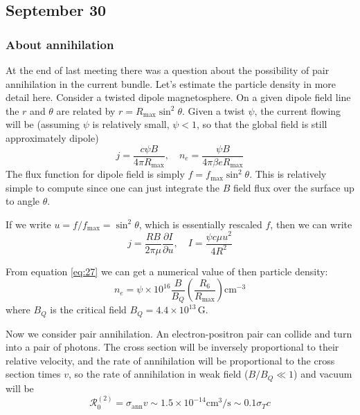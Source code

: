 \documentclass[letterpaper, 11pt]{article}
\numberwithin{equation}{section}
\numberwithin{figure}{section}
\begin{document}
\subsection{September 30}
\label{sec:sept-30}

\subsubsection{About annihilation}
\label{sec:annihilation}

At the end of last meeting there was a question about the possibility of pair annihilation in the current bundle. Let's estimate the particle density in more detail here. Consider a twisted dipole magnetosphere. On a given dipole field line the $r$ and $\theta$ are related by $r = R_\mathrm{max}\sin^2\theta$. Given a twist $\psi$, the current flowing will be (assuming $\psi$ is relatively small, $\psi < 1$, so that the global field is still approximately dipole)
\begin{equation}
    \label{eq:27}
    j = \frac{c\psi B}{4\pi R_\mathrm{max}},\quad n_e = \frac{\psi B}{4\pi\beta e R_\mathrm{max}}
\end{equation}
The flux function for dipole field is simply $f = f_\mathrm{max}\sin^2\theta$. This is relatively simple to compute since one can just integrate the $B$ field flux over the surface up to angle $\theta$.

If we write $u = f/f_\mathrm{max} = \sin^2\theta$, which is essentially rescaled $f$, then we can write
\begin{equation}
    \label{eq:28}
    j = \frac{R B}{2\pi \mu} \frac{\partial I}{\partial u},\quad I = \frac{\psi c\mu u^2}{4R^2}
\end{equation}

From equation \eqref{eq:27} we can get a numerical value of then particle density:
\begin{equation}
    \label{eq:29}
    n_e = \psi \times 10^{16}\frac{B}{B_Q}\left( \frac{R_6}{R_\mathrm{max}} \right) \mathrm{cm}^{-3}
\end{equation}
where $B_Q$ is the critical field $B_Q = 4.4\times 10^{13}\,\mathrm{G}$.

Now we consider pair annihilation. An electron-positron pair can collide and turn into a pair of photons. The cross section will be inversely proportional to their relative velocity, and the rate of annihilation will be proportional to the cross section times $v$, so the rate of annihilation in weak field ($B/B_Q\ll 1$) and vacuum will be
\begin{equation}
    \label{eq:30}
    \mathcal{R}_{0}^{(2)} = \sigma_\mathrm{ann}v \sim 1.5\times 10^{-14} \mathrm{cm^3/s} \sim 0.1\sigma_Tc
\end{equation}
\end{document}
